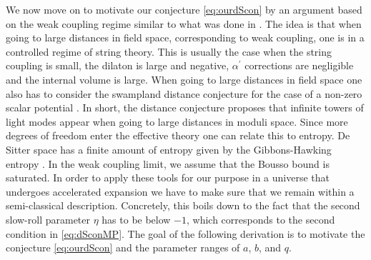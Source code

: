 \documentclass[a4paper,12pt]{report}
\begin{document}
We now move on to motivate our conjecture \eqref{eq:ourdScon} by an argument based on the weak coupling regime similar to what was done in \cite{Ooguri:2018wrx}. The idea is that when going to large distances in field space, corresponding to weak coupling, one is in a controlled regime of string theory. This is usually the case when the string coupling is small, the dilaton is large and negative, $\alpha^ \prime$ corrections are negligible and the internal volume is large. When going to large distances in field space one also has to consider the swampland distance conjecture \cite{Baume:2016psm} for the case of a non-zero scalar potential \cite{Klaewer:2016kiy,Ooguri:2006in}. In short, the distance conjecture proposes that infinite towers of light modes appear when going to large distances in moduli space. Since more degrees of freedom enter the effective theory one can relate this to entropy. De Sitter space has a finite amount of entropy given by the Gibbons-Hawking entropy \cite{Gibbons:1977mu}. In the weak coupling limit, we assume that the Bousso bound \cite{Bousso:1999xy} is saturated. In order to apply these tools for our purpose in a universe that undergoes accelerated expansion we have to make sure that we remain within a semi-classical description. Concretely, this boils down to the fact that the second slow-roll parameter $\eta$ has to be below $-1$, which corresponds to the second condition in \eqref{eq:dSconMP}. The goal of the following derivation is to motivate the conjecture \eqref{eq:ourdScon} and the parameter ranges of $a$, $b$, and $q$.
\end{document}
